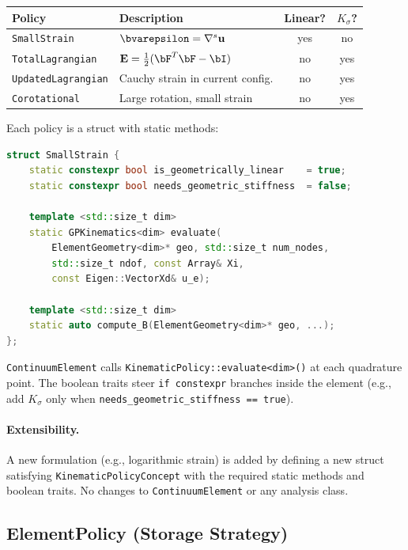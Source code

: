 \begin{center}
\small
\begin{tabular}{lp{5cm}cc}
  \toprule
  Policy & Description & Linear? & $K_\sigma$? \\
  \midrule
  \texttt{SmallStrain}       & $\bvarepsilon = \nabla^s \mathbf{u}$ & yes & no \\
  \texttt{TotalLagrangian}   & $\mathbf{E} = \frac{1}{2}(\bF^T\bF - \bI)$ & no & yes \\
  \texttt{UpdatedLagrangian} & Cauchy strain in current config. & no & yes \\
  \texttt{Corotational}      & Large rotation, small strain & no & yes \\
  \bottomrule
\end{tabular}
\end{center}

Each policy is a struct with static methods:
\begin{lstlisting}[language=C++]
struct SmallStrain {
    static constexpr bool is_geometrically_linear    = true;
    static constexpr bool needs_geometric_stiffness  = false;
    
    template <std::size_t dim>
    static GPKinematics<dim> evaluate(
        ElementGeometry<dim>* geo, std::size_t num_nodes,
        std::size_t ndof, const Array& Xi,
        const Eigen::VectorXd& u_e);

    template <std::size_t dim>
    static auto compute_B(ElementGeometry<dim>* geo, ...);
};
\end{lstlisting}

\texttt{ContinuumElement} calls \texttt{KinematicPolicy::evaluate<dim>()} at
each quadrature point.  The boolean traits steer \texttt{if constexpr}
branches inside the element (e.g., add $K_\sigma$ only when
\texttt{needs\_geometric\_stiffness == true}).

\paragraph{Extensibility.}
A new formulation (e.g., logarithmic strain) is added by defining a new
struct satisfying \texttt{KinematicPolicyConcept} with the required static
methods and boolean traits.  No changes to \texttt{ContinuumElement} or any
analysis class.


\subsection{ElementPolicy (Storage Strategy)}
\label{sec:elem_policy}

